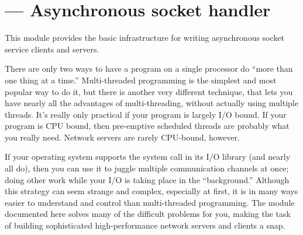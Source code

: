 \section{ ---
         Asynchronous socket handler}


This module provides the basic infrastructure for writing asynchronous 
socket service clients and servers.

There are only two ways to have a program on a single processor do 
``more than one thing at a time.'' Multi-threaded programming is the 
simplest and most popular way to do it, but there is another very 
different technique, that lets you have nearly all the advantages of 
multi-threading, without actually using multiple threads.  It's really 
only practical if your program is largely I/O bound.  If your program 
is CPU bound, then pre-emptive scheduled threads are probably what 
you really need. Network servers are rarely CPU-bound, however.

If your operating system supports the  system call 
in its I/O library (and nearly all do), then you can use it to juggle 
multiple communication channels at once; doing other work while your 
I/O is taking place in the ``background.''  Although this strategy can 
seem strange and complex, especially at first, it is in many ways 
easier to understand and control than multi-threaded programming.  
The module documented here solves many of the difficult problems for 
you, making the task of building sophisticated high-performance 
network servers and clients a snap.

